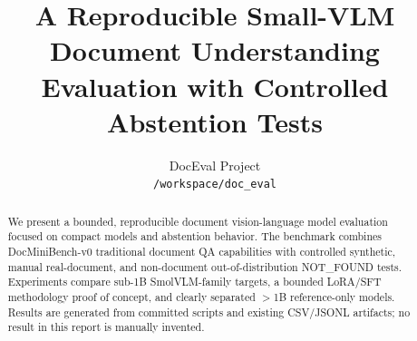 \documentclass[11pt]{article}
\title{A Reproducible Small-VLM Document Understanding Evaluation with Controlled Abstention Tests}
\author{DocEval Project\\
  \texttt{/workspace/doc\_eval}}
\begin{document}
\maketitle

\begin{abstract}
We present a bounded, reproducible document vision-language model evaluation
focused on compact models and abstention behavior. The benchmark combines
DocMiniBench-v0 traditional document QA capabilities with controlled synthetic,
manual real-document, and non-document out-of-distribution NOT\_FOUND tests.
Experiments compare sub-1B SmolVLM-family targets, a bounded LoRA/SFT
methodology proof of concept, and clearly separated $>$1B reference-only
models. Results are generated from committed scripts and existing CSV/JSONL
artifacts; no result in this report is manually invented.
\end{abstract}











\appendix

\end{document}
